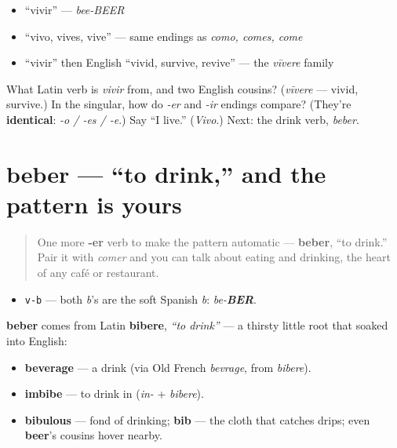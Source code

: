 \begin{itemize}
\raggedright
  \item \textquotedblleft{}vivir\textquotedblright{} — \emph{bee-BEER}
  \item \textquotedblleft{}vivo, vives, vive\textquotedblright{} — same endings as \emph{como, comes, come}
  \item \textquotedblleft{}vivir\textquotedblright{} then English \textquotedblleft{}vivid, survive, revive\textquotedblright{} — the \emph{vīvere} family
\end{itemize}

\begin{tcolorbox}[breakable,colback=teal!4,colframe=teal!35!black,title={Before you move on}]
What Latin verb is \emph{vivir} from, and two English cousins? (\emph{vīvere} — vivid, survive.) In the singular, how do \emph{-er} and \emph{-ir} endings compare? (They're \textbf{identical}: \emph{-o / -es / -e}.) Say \textquotedblleft{}I live.\textquotedblright{} (\emph{Vivo}.) Next: the drink verb, \emph{beber}.
\end{tcolorbox}
\section[beber]{beber — \textquotedblleft{}to drink,\textquotedblright{} and the pattern is yours}

\label{lesson:ES-C07-beber}



\begin{quote}
One more \textbf{-er} verb to make the pattern automatic — \textbf{beber}, \textquotedblleft{}to drink.\textquotedblright{} Pair it with \emph{comer} and you can talk about eating and drinking, the heart of any café or restaurant.
\end{quote}

\begin{sounds}
\begin{itemize}
\raggedright
  \item \texttt{v-b} — both \emph{b}'s are the soft Spanish \emph{b}: \emph{be-\textbf{BER}}.
\end{itemize}
\end{sounds}

\begin{cousinweb}
\textbf{beber} comes from Latin \textbf{bibere}, \emph{\textquotedblleft{}to drink\textquotedblright{}} — a thirsty little root that soaked into English:

\begin{itemize}
\raggedright
  \item \textbf{beverage} — a drink (via Old French \emph{bevrage}, from \emph{bibere}).
  \item \textbf{imbibe} — to drink in (\emph{in-} + \emph{bibere}).
  \item \textbf{bibulous} — fond of drinking; \textbf{bib} — the cloth that catches drips; even \textbf{beer}'s cousins hover nearby.
\end{itemize}
\end{cousinweb}

